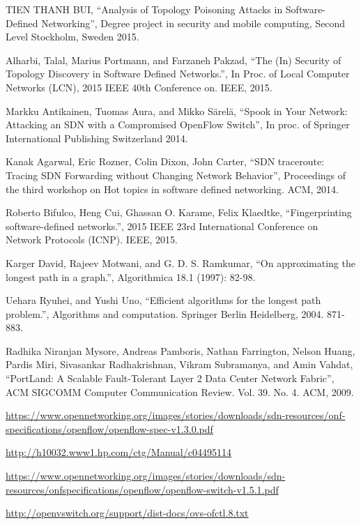 \begin{thebibliography}{1}
TIEN THANH BUI,
``Analysis of Topology Poisoning Attacks in Software-Defined Networking'', Degree project in security and mobile computing, Second Level Stockholm, Sweden 2015.

Alharbi, Talal, Marius Portmann, and Farzaneh Pakzad,
``The (In) Security of Topology Discovery in Software Defined Networks.'', In Proc. of Local Computer Networks (LCN), 2015 IEEE 40th Conference on. IEEE, 2015.

Markku Antikainen, Tuomas Aura, and Mikko Särelä,
``Spook in Your Network: Attacking an SDN with a Compromised OpenFlow Switch'', In proc. of Springer International Publishing Switzerland 2014.

Kanak Agarwal, Eric Rozner, Colin Dixon, John Carter,
``SDN traceroute: Tracing SDN Forwarding without Changing Network Behavior'', Proceedings of the third workshop on Hot topics in software defined networking. ACM, 2014.

Roberto Bifulco, Heng Cui, Ghassan O. Karame, Felix Klaedtke,
``Fingerprinting software-defined networks.'', 2015 IEEE 23rd International Conference on Network Protocols (ICNP). IEEE, 2015.

Karger David, Rajeev Motwani, and G. D. S. Ramkumar,
``On approximating the longest path in a graph.'', Algorithmica 18.1 (1997): 82-98.

Uehara Ryuhei, and Yushi Uno,
``Efficient algorithms for the longest path problem.'', Algorithms and computation. Springer Berlin Heidelberg, 2004. 871-883.

Radhika Niranjan Mysore, Andreas Pamboris, Nathan Farrington, Nelson Huang, Pardis Miri, Sivasankar Radhakrishnan, Vikram Subramanya, and Amin Vahdat,
``PortLand: A Scalable Fault-Tolerant Layer 2 Data Center Network Fabric'', ACM SIGCOMM Computer Communication Review. Vol. 39. No. 4. ACM, 2009.

\url{https://www.opennetworking.org/images/stories/downloads/sdn-resources/onf-specifications/openflow/openflow-spec-v1.3.0.pdf}

\url{http://h10032.www1.hp.com/ctg/Manual/c04495114}

\url{https://www.opennetworking.org/images/stories/downloads/sdn-resources/onfspecifications/openflow/openflow-switch-v1.5.1.pdf}

\url{http://openvswitch.org/support/dist-docs/ovs-ofctl.8.txt}


\end{thebibliography}
